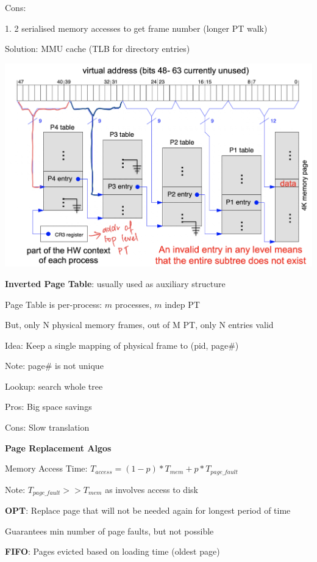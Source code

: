 \documentclass[10pt, a4paper]{article}
\newcommand{\blue}[1]{{\color{MidnightBlue}#1}}
\newcommand{\red}[1]{{\color{red}#1}}
\newcommand{\green}[1]{{\color{ForestGreen}#1}}
\begin{document}
\begin{multicols*}{3}
		\red{Cons}:

		1. 2 \red{serialised} memory accesses to get frame number (longer PT walk)

		\green{Solution}: MMU cache (TLB for directory entries)

		\includegraphics*[scale=0.33]{./assets/hierarchicalPT}

		\textbf{Inverted Page Table}: usually used as auxiliary structure

		Page Table is \blue{per-process}: $m$ processes, $m$ indep PT

		But, only \red{N} physical memory frames, out of \green{M} PT, only \red{N} entries valid

		Idea: Keep a \red{single} mapping of physical frame to \blue{(pid, page\#)}

		\red{Note}: page\# is not unique

		Lookup: search \red{whole tree}

		\green{Pros}: Big space savings

		\red{Cons}: Slow translation

		\textbf{Page Replacement Algos}

		Memory Access Time: $T_{access} = (1 - p) * T_{mem} + p * T_{page\_fault}$

		Note: $T_{page\_fault} >> T_{mem}$ as involves access to disk

		\textbf{OPT}: Replace page that \blue{will not} be needed again for \red{longest period of time}

		Guarantees min number of page faults, but not possible

		\textbf{FIFO}: Pages evicted based on loading time (oldest page)


\end{multicols*}
\end{document}
